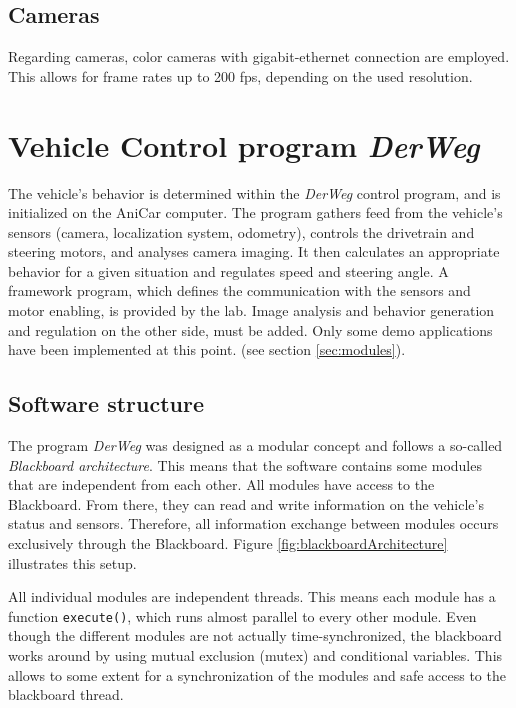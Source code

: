 \documentclass[a4paper, 11pt]{article}
\newcommand{\code}[1]{\texttt{#1}}
\newcommand{\DerWeg}{\textit{DerWeg }} %
\begin{document}
{\subsection{Cameras}
Regarding cameras, color cameras with gigabit-ethernet connection are employed. This allows for frame rates up to 200 fps, depending on the used resolution.

\section{Vehicle Control program \DerWeg}

The vehicle’s behavior is determined within the \DerWeg control program, and is initialized on the AniCar computer. The program gathers feed from the vehicle’s sensors (camera, localization system, odometry), controls the drivetrain and steering motors, and analyses camera imaging. It then calculates an appropriate behavior for a given situation and regulates speed and steering angle. A framework program, which defines the communication with the sensors and motor enabling, is provided by the lab. Image analysis and behavior generation and regulation on the other side, must be added.  Only some demo applications have been implemented at this point. (see section \ref{sec:modules}).

\subsection{Software structure}

The program \DerWeg was designed as a modular concept and follows a so-called \textit{Blackboard architecture}.  This means that the software contains some modules that are independent from each other. All modules have access to the Blackboard. From there, they can read and write information on the vehicle's status and sensors. Therefore, all information exchange between modules occurs exclusively through the Blackboard. Figure \ref{fig:blackboardArchitecture} illustrates this setup.

All individual modules are independent threads. This means each module has a function \code{execute()}, which runs almost parallel to every other module. Even though the different modules are not actually time-synchronized, the blackboard works around by using mutual exclusion (mutex) and conditional variables. This allows to some extent for a synchronization of the modules and safe access to the blackboard thread.

}
\end{document}
